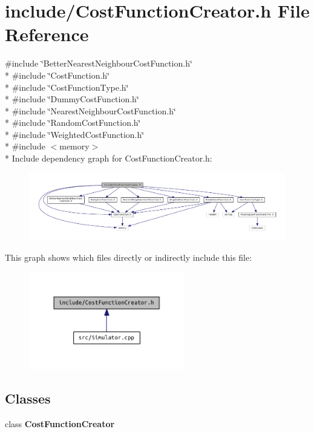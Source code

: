 \section{include/\+Cost\+Function\+Creator.h File Reference}
\label{_cost_function_creator_8h}
{\ttfamily \#include \char`\"{}Better\+Nearest\+Neighbour\+Cost\+Function.\+h\char`\"{}}\\*
{\ttfamily \#include \char`\"{}Cost\+Function.\+h\char`\"{}}\\*
{\ttfamily \#include \char`\"{}Cost\+Function\+Type.\+h\char`\"{}}\\*
{\ttfamily \#include \char`\"{}Dummy\+Cost\+Function.\+h\char`\"{}}\\*
{\ttfamily \#include \char`\"{}Nearest\+Neighbour\+Cost\+Function.\+h\char`\"{}}\\*
{\ttfamily \#include \char`\"{}Random\+Cost\+Function.\+h\char`\"{}}\\*
{\ttfamily \#include \char`\"{}Weighted\+Cost\+Function.\+h\char`\"{}}\\*
{\ttfamily \#include $<$memory$>$}\\*
Include dependency graph for Cost\+Function\+Creator.\+h\+:\nopagebreak
\begin{figure}[H]
\begin{center}
\leavevmode
\includegraphics[width=350pt]{_cost_function_creator_8h__incl}
\end{center}
\end{figure}
This graph shows which files directly or indirectly include this file\+:\nopagebreak
\begin{figure}[H]
\begin{center}
\leavevmode
\includegraphics[width=193pt]{_cost_function_creator_8h__dep__incl}
\end{center}
\end{figure}
\subsection*{Classes}
\begin{DoxyCompactItemize}
\item 
class {\bf Cost\+Function\+Creator}
\end{DoxyCompactItemize}

